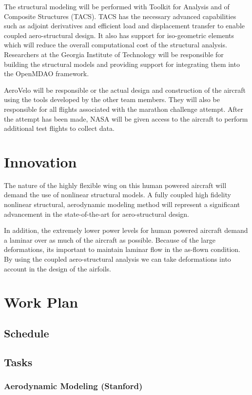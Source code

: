 \documentclass[]{report}
\begin{document}
    The structural modeling will be performed with Toolkit for Analysis and of Composite 
    Structures (TACS). TACS has the necessary advanced capabilities such as adjoint derivatives 
    and efficient load and displacement transfer to enable coupled aero­-structural design. It also has 
    support for iso-geometric elements which will reduce the overall computational cost of the 
    structural analysis. Researchers at the Georgia Institute of Technology will be responsible for 
    building the structural models and providing support for integrating them into the OpenMDAO framework. 

    AeroVelo will be responsible or the actual design and construction of the aircraft using the tools developed 
    by the other team members. They will also be responsible for all flights associated with 
    the marathon challenge attempt. After the attempt has been made, NASA will be given access to 
    the aircraft to perform additional test flights to collect data. 


  \section{Innovation}
    The nature of the highly flexible wing on this human powered aircraft will demand the use 
    of nonlinear structural models. A fully coupled high fidelity nonlinear structural, aerodynamic modeling method 
    will represent a significant advancement in the state­-of-­the-­art for aero­-structural design. 

    In addition, the extremely lower power levels for human powered aircraft demand a laminar over as much of 
    the aircraft as possible. Because of the large deformations, its important to maintain laminar flow in the 
    as-flown condition. By using the coupled aero-structural analysis we can take deformations into account in the design 
    of the airfoils. 

  \section{Work Plan}
    \subsection{Schedule}
    \subsection{Tasks}
        \subsubsection{Aerodynamic Modeling (Stanford)}
\end{document}
